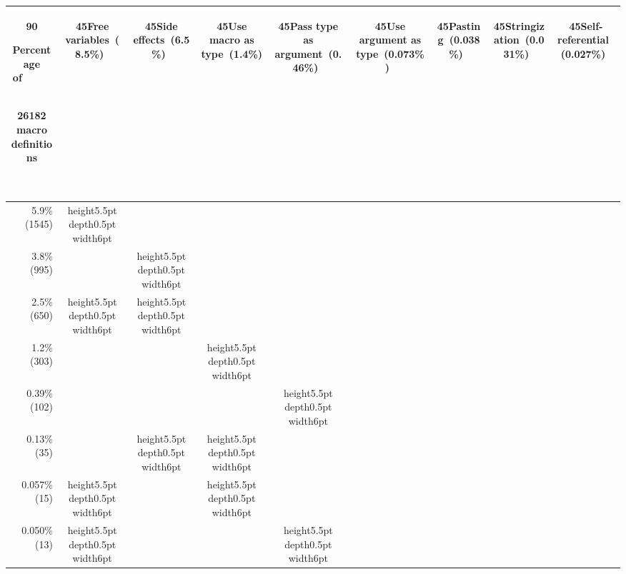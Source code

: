 
\newcommand{\black}{\vrule height5.5pt depth0.5pt width6pt}
{\footnotesize
\addtolength{\tabcolsep}{-.3\tabcolsep}
\vspace*{.4in}
\begin{tabular}{|r|*{8}{c|}}
\multicolumn{1}{c}{\begin{rotate}{90}{\parbox{1in}{Percentage of~~~~~\strut \\ 26182 macro \\ definitions}~}\end{rotate}} &
\multicolumn{1}{c}{\begin{rotate}{45}{Free variables~(8.5\%)~}\end{rotate}} &
\multicolumn{1}{c}{\begin{rotate}{45}{Side effects~(6.5\%)~}\end{rotate}} &
\multicolumn{1}{c}{\begin{rotate}{45}{Use macro as type~(1.4\%)~}\end{rotate}} &
\multicolumn{1}{c}{\begin{rotate}{45}{Pass type as argument~(0.46\%)~}\end{rotate}} &
\multicolumn{1}{c}{\begin{rotate}{45}{Use argument as type~(0.073\%)~}\end{rotate}} &
\multicolumn{1}{c}{\begin{rotate}{45}{Pasting~(0.038\%)~}\end{rotate}} &
\multicolumn{1}{c}{\begin{rotate}{45}{Stringization~(0.031\%)~}\end{rotate}} &
\multicolumn{1}{c}{\begin{rotate}{45}{Self-referential~(0.027\%)~}\end{rotate}}
\\ \hline
5.9\% (1545)&\black& & & & & & & \\ \hline
3.8\% (995)& &\black& & & & & & \\ \hline
2.5\% (650)&\black&\black& & & & & & \\ \hline
1.2\% (303)& & &\black& & & & & \\ \hline
0.39\% (102)& & & &\black& & & & \\ \hline
0.13\% (35)& &\black&\black& & & & & \\ \hline
0.057\% (15)&\black& &\black& & & & & \\ \hline
0.050\% (13)&\black& & &\black& & & & \\ \hline

\end{tabular}}

